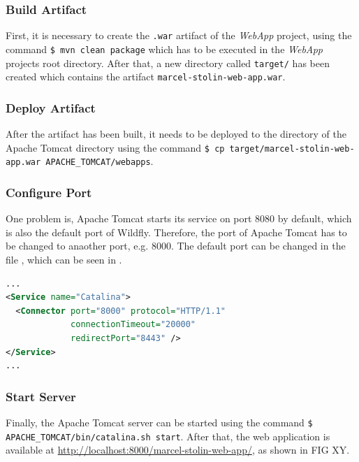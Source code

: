 \subsubsection{Build Artifact}\label{sec:03_depl_webapp_artifact}
First, it is necessary to create the \texttt{.war} artifact of the \textit{WebApp} project, using the command \texttt{\$ mvn clean package} which has to be executed in the \textit{WebApp} projects root directory. After that, a new directory called \texttt{target/} has been created which contains the artifact \texttt{marcel-stolin-web-app.war}.

\subsubsection{Deploy Artifact}\label{sec:03_depl_webapp_deploy}
After the artifact has been built, it needs to be deployed to the  directory of the Apache Tomcat directory using the command \texttt{\$ cp target/marcel-stolin-web-app.war APACHE\_TOMCAT/webapps}.

\subsubsection{Configure Port}\label{sec:03_depl_webapp_config}
One problem is, Apache Tomcat starts its service on port 8080 by default, which is also the default port of Wildfly. Therefore, the port of Apache Tomcat has to be changed to anaother port, e.g. 8000. The default port can be changed in the file , which can be seen in .
\begin{lstlisting}[label=lst:03_depl_webapp_config_server, caption=Default data source configuration, language=xml]
...
<Service name="Catalina">
  <Connector port="8000" protocol="HTTP/1.1"
             connectionTimeout="20000"
             redirectPort="8443" />
</Service>
...
\end{lstlisting}

\subsubsection{Start Server}\label{sec:03_depl_webapp_start}
Finally, the Apache Tomcat server can be started using the command \texttt{\$ APACHE\_TOMCAT/bin/catalina.sh start}. After that, the web application is available at \url{http://localhost:8000/marcel-stolin-web-app/}, as shown in FIG XY.
